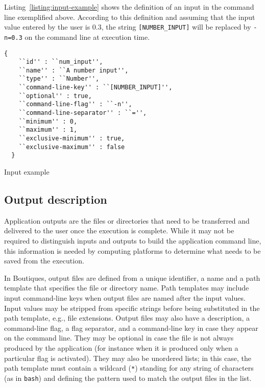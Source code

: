 \documentclass{article}
\begin{document}
Listing~\ref{listing:input-example} shows the definition of an input
in the command line exemplified above. According to this definition
and assuming that the input value entered by the user is 0.3, the
string \texttt{[NUMBER\_INPUT]} will be replaced by \texttt{-n=0.3} on
the command line at execution time.
\begin{listing}
\begin{verbatim}
{
    ``id'' : ``num_input'',
    ``name'' : ``A number input'',
    ``type'' : ``Number'',
    ``command-line-key'' : ``[NUMBER_INPUT]'',
    ``optional'' : true,
    ``command-line-flag'' : ``-n'',
    ``command-line-separator'' : ``='',
    ``minimum'' : 0,
    ``maximum'' : 1,
    ``exclusive-minimum'' : true,
    ``exclusive-maximum'' : false
  }
\end{verbatim}
\caption{Input example} 
\label{listing:input-example}
\end{listing}

\subsection{Output description}

Application outputs are the files or directories that need to be
transferred and delivered to the user once the execution is
complete. While it may not be required to distinguish inputs and
outputs to build the application command line, this information is
needed by computing platforms to determine what needs to be saved from
the execution. 

In Boutiques, output files are defined from a unique identifier, a
name and a path template that specifies the file or directory
name. Path templates may include input command-line keys when output
files are named after the input values. Input values may be stripped
from specific strings before being substituted in the path template,
e.g., file extensions. Output files may also have a description, a
command-line flag, a flag separator, and a command-line key in case
they appear on the command line. They may be optional in case the file
is not always produced by the application (for instance when it is
produced only when a particular flag is activated). They may also be
unordered lists; in this case, the path template must contain a
wildcard (\texttt{*}) standing for any string of characters (as in
\texttt{bash}) and defining the pattern used to match the output files
in the list.
\end{document}
